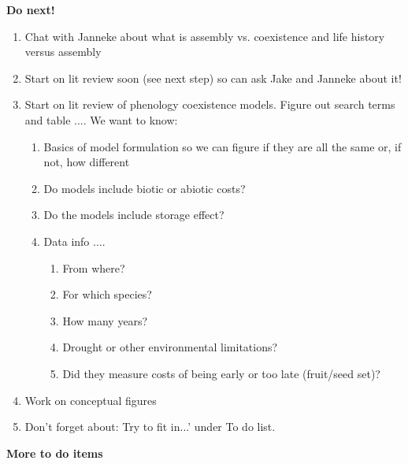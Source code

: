 \documentclass[11pt]{article}
\begin{document}
{\bf \large Do next!} 

\begin{enumerate}
\item Chat with Janneke about what is assembly vs. coexistence and life history versus assembly
\item Start on lit review soon (see next step) so can ask Jake and Janneke about it!
\item Start on lit review of phenology coexistence models. Figure out search terms  and table .... We want to know: 
\begin{enumerate}
\item Basics of model formulation so we can figure if they are all the same or, if not, how different
\item Do models include biotic or abiotic costs?
\item Do the models include storage effect?
\item Data info ....
\begin{enumerate}
\item From where?
\item For which species?
\item How many years?
\item Drought or other environmental limitations?
\item Did they measure costs of being early or too late (fruit/seed set)?
\end{enumerate}
\end{enumerate}
\item Work on conceptual figures 
\item Don't forget about: Try to fit in...' under To do list. 
\end{enumerate}

\vspace{2ex}
{\bf \large More to do items} 
\end{document}
